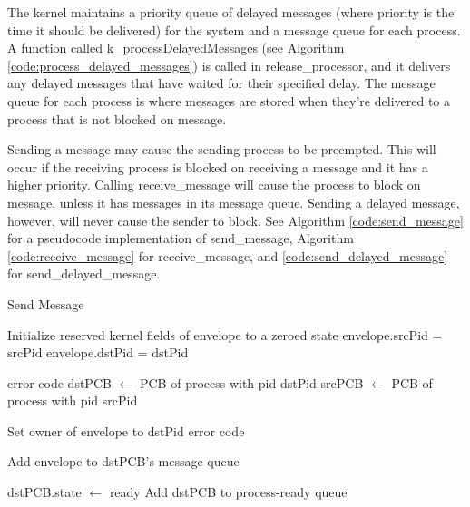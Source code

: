 \documentclass[12pt]{report}
\begin{document}
    The kernel maintains a priority queue of delayed messages (where priority is
    the time it should be delivered) for the system and a message queue for each
    process. A function called k\_processDelayedMessages (see Algorithm
    \ref{code:process_delayed_messages}) is called in release\_processor, and it
    delivers any delayed messages that have waited for their specified delay.
    The  message queue for each process is where messages are stored when
    they're delivered to a process that is not blocked on message.

    Sending a message may cause the sending process to be preempted. This will
    occur if the receiving process is blocked on receiving a message and it has
    a higher priority. Calling receive\_message will cause the process to block
    on message, unless it has messages in its message queue. Sending a delayed
    message, however, will never cause  the sender to block. See Algorithm
    \ref{code:send_message} for a pseudocode implementation  of send\_message,
    Algorithm \ref{code:receive_message} for receive\_message, and
    \ref{code:send_delayed_message} for send\_delayed\_message.

    \begin{algorithm}
    \caption{Send Message}
    \label{code:send_message}
    \begin{algorithmic}[1]
            \State Initialize reserved kernel fields of envelope to a zeroed state
            \State envelope.srcPid = srcPid
            \State envelope.dstPid = dstPid

                \State \Return error code
            \EndIf
            \State dstPCB $\gets$ PCB of process with pid dstPid
            \State srcPCB $\gets$ PCB of process with pid srcPid

                \State Set owner of envelope to dstPid
            \Else
                \State \Return error code
            \EndIf

            \State Add envelope to dstPCB's message queue

             
                \State dstPCB.state $\gets$ ready
                \State Add dstPCB to process-ready queue
                    \State {} 
                \EndIf
            \EndIf
        \EndFunction
    \end{algorithmic}
    \end{algorithm}
\end{document}
